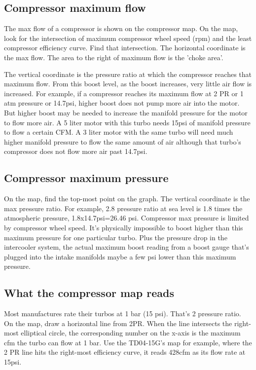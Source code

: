 \documentclass[11pt,a4paper]{book}
\begin{document}
\subsection{Compressor maximum flow}
The max flow of a compressor is shown on the compressor map. On the map, look for the intersection
of maximum compressor wheel speed (rpm) and the least compressor efficiency curve. Find that
intersection. The horizontal coordinate is the max flow.
The area to the right of maximum flow is the 'choke area'.

The vertical coordinate is the pressure ratio at which the compressor reaches that maximum flow.
From this boost level, as the boost increases, very little air flow is increased. For example, if a
compressor reaches its maximum flow at 2 PR or 1 atm pressure or 14.7psi, higher boost does not
pump more air into the motor. But higher boost may be needed to increase the manifold pressure for
the motor to flow more air. A 5 liter motor with this turbo needs 15psi of manifold pressure to flow a
certain CFM. A 3 liter motor with the same turbo will need much higher manifold pressure to flow the
same amount of air although that turbo's compressor does not flow more air past 14.7psi.

\subsection{Compressor maximum pressure}
On the map, find the top-most point on the graph. The vertical coordinate is the max pressure ratio.
For example, 2.8 pressure ratio at sea level is 1.8 times the atmospheric pressure, 1.8x14.7psi=26.46
psi. Compressor max pressure is limited by compressor wheel speed. It's physically impossible to
boost higher than this maximum pressure for one particular turbo. Plus the pressure drop in the
intercooler system, the actual maximum boost reading from a boost gauge that's plugged into the
intake manifolds maybe a few psi lower than this maximum pressure.

\subsection{What the compressor map reads}
Most manufactures rate their turbos at 1 bar (15 psi). That's 2 pressure ratio. On the map, draw a
horizontal line from 2PR. When the line intersects the right-most elliptical circle, the corresponding
number on the x-axis is the maximum cfm the turbo can flow at 1 bar.
Use the TD04-15G's map for example, where the 2 PR line hits the right-most efficiency curve, it
reads 428cfm as its flow rate at 15psi.
\end{document}
